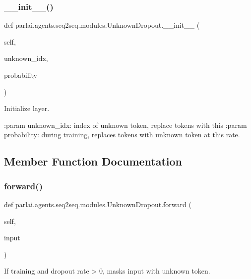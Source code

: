 \subsubsection{\texorpdfstring{\+\_\+\+\_\+init\+\_\+\+\_\+()}{\_\_init\_\_()}}
{\footnotesize\ttfamily def parlai.\+agents.\+seq2seq.\+modules.\+Unknown\+Dropout.\+\_\+\+\_\+init\+\_\+\+\_\+ (\begin{DoxyParamCaption}\item[{}]{self,  }\item[{}]{unknown\+\_\+idx,  }\item[{}]{probability }\end{DoxyParamCaption})}

\begin{DoxyVerb}Initialize layer.

:param unknown_idx: index of unknown token, replace tokens with this
:param probability: during training, replaces tokens with unknown token
            at this rate.
\end{DoxyVerb}
 

\subsection{Member Function Documentation}
\mbox{\label{classparlai_1_1agents_1_1seq2seq_1_1modules_1_1UnknownDropout_ae0771638ed591c911178d94cd2bdc59d}} 
\subsubsection{\texorpdfstring{forward()}{forward()}}
{\footnotesize\ttfamily def parlai.\+agents.\+seq2seq.\+modules.\+Unknown\+Dropout.\+forward (\begin{DoxyParamCaption}\item[{}]{self,  }\item[{}]{input }\end{DoxyParamCaption})}

\begin{DoxyVerb}If training and dropout rate > 0, masks input with unknown token.
\end{DoxyVerb}
 

